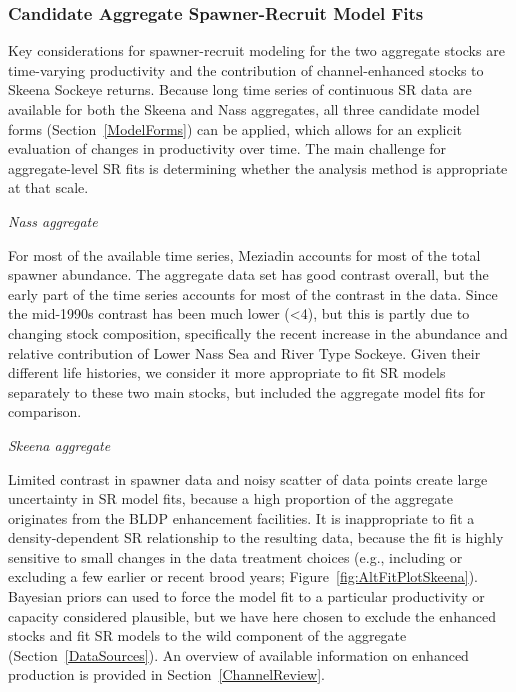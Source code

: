 \documentclass[french,11pt]{book}
\begin{document}
\endgroup{} \endgroup{}

\clearpage

\subsubsection{Candidate Aggregate Spawner-Recruit Model Fits}\label{CandidateAggModels}

Key considerations for spawner-recruit modeling for the two aggregate stocks are time-varying productivity and the contribution of channel-enhanced stocks to Skeena Sockeye returns. Because long time series of continuous SR data are available for both the Skeena and Nass aggregates, all three candidate model forms (Section~\ref{ModelForms}) can be applied, which allows for an explicit evaluation of changes in productivity over time. The main challenge for aggregate-level SR fits is determining whether the analysis method is appropriate at that scale.

\emph{Nass aggregate}

For most of the available time series, Meziadin accounts for most of the total spawner abundance. The aggregate data set has good contrast overall, but the early part of the time series accounts for most of the contrast in the data. Since the mid-1990s contrast has been much lower (\textless4), but this is partly due to changing stock composition, specifically the recent increase in the abundance and relative contribution of Lower Nass Sea and River Type Sockeye. Given their different life histories, we consider it more appropriate to fit SR models separately to these two main stocks, but included the aggregate model fits for comparison.

\emph{Skeena aggregate}

Limited contrast in spawner data and noisy scatter of data points create large uncertainty in SR model fits, because a high proportion of the aggregate originates from the BLDP enhancement facilities. It is inappropriate to fit a density-dependent SR relationship to the resulting data, because the fit is highly sensitive to small changes in the data treatment choices (e.g., including or excluding a few earlier or recent brood years; Figure~\ref{fig:AltFitPlotSkeena}). Bayesian priors can used to force the model fit to a particular productivity or capacity considered plausible, but we have here chosen to exclude the enhanced stocks and fit SR models to the wild component of the aggregate (Section~\ref{DataSources}). An overview of available information on enhanced production is provided in Section~\ref{ChannelReview}.
\end{document}
